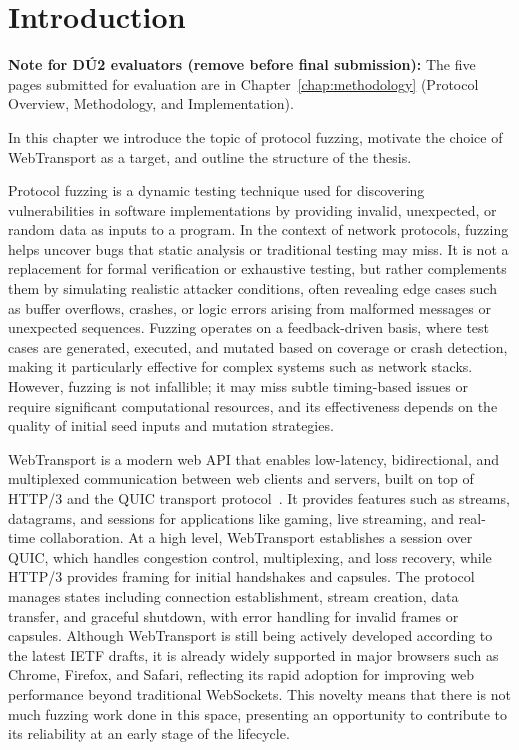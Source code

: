 \chapter*{Introduction}

{\small\noindent\textbf{Note for DÚ2 evaluators (remove before final submission):} The five pages submitted for evaluation are in Chapter~\ref{chap:methodology} (Protocol Overview, Methodology, and Implementation).}

In this chapter we introduce the topic of protocol fuzzing, motivate the choice of WebTransport as a target, and outline the structure of the thesis.

Protocol fuzzing is a dynamic testing technique used for discovering vulnerabilities in software implementations by providing invalid, unexpected, or random data as inputs to a program. In the context of network protocols, fuzzing helps uncover bugs that static analysis or traditional testing may miss. It is not a replacement for formal verification or exhaustive testing, but rather complements them by simulating realistic attacker conditions, often revealing edge cases such as buffer overflows, crashes, or logic errors arising from malformed messages or unexpected sequences. Fuzzing operates on a feedback-driven basis, where test cases are generated, executed, and mutated based on coverage or crash detection, making it particularly effective for complex systems such as network stacks. However, fuzzing is not infallible; it may miss subtle timing-based issues or require significant computational resources, and its effectiveness depends on the quality of initial seed inputs and mutation strategies.

WebTransport is a modern web API that enables low-latency, bidirectional, and multiplexed communication between web clients and servers, built on top of HTTP/3 and the QUIC transport protocol~\cite{webtransport_http3, webtransport_api}. It provides features such as streams, datagrams, and sessions for applications like gaming, live streaming, and real-time collaboration. At a high level, WebTransport establishes a session over QUIC, which handles congestion control, multiplexing, and loss recovery, while HTTP/3 provides framing for initial handshakes and capsules. The protocol manages states including connection establishment, stream creation, data transfer, and graceful shutdown, with error handling for invalid frames or capsules. Although WebTransport is still being actively developed according to the latest IETF drafts, it is already widely supported in major browsers such as Chrome, Firefox, and Safari, reflecting its rapid adoption for improving web performance beyond traditional WebSockets. This novelty means that there is not much fuzzing work done in this space, presenting an opportunity to contribute to its reliability at an early stage of the lifecycle.

